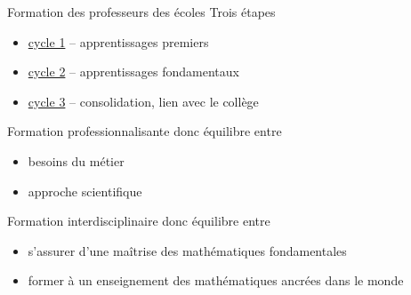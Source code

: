 \documentclass[
  french,
  ignorenonframetext,
]{beamer}
\providecommand{\tightlist}{%
  \setlength{\itemsep}{0pt}\setlength{\parskip}{0pt}}
\begin{document}
\begin{frame}{Formation des professeurs des écoles}
\protect\hypertarget{formation-des-professeurs-des-uxe9coles}{}
Trois étapes

\begin{itemize}
\tightlist
\item
  \href{https://eduscol.education.fr/pid33040/programme-ressources-et-evaluation.html}{cycle
  1} -- apprentissages premiers
\item
  \href{https://eduscol.education.fr/pid34139/cycle-2-ecole-elementaire.html}{cycle
  2} -- apprentissages fondamentaux
\item
  \href{https://eduscol.education.fr/pid34150/cycle-3-ecole-elementaire-college.html}{cycle
  3} -- consolidation, lien avec le collège
\end{itemize}

Formation professionnalisante donc équilibre entre

\begin{itemize}
\tightlist
\item
  besoins du métier
\item
  approche scientifique
\end{itemize}

Formation interdisciplinaire donc équilibre entre

\begin{itemize}
\tightlist
\item
  s'assurer d'une maîtrise des mathématiques fondamentales
\item
  former à un enseignement des mathématiques ancrées dans le monde
\end{itemize}
\end{frame}
\end{document}
